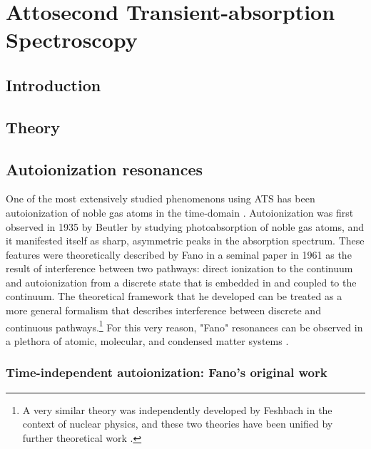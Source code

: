 \chapter{Attosecond Transient-absorption Spectroscopy}
\label{chap:ATS}

\section{Introduction}
\label{sec:intro_ats}

\section{Theory}
\label{sec:atas_theory}

\section{Autoionization resonances}
\label{sec:fano_ar}

One of the most extensively studied phenomenons using ATS has been autoionization of noble gas atoms in the time-domain \cite{wangAttosecondTimeResolvedAutoionization2010, ottAttosecondMultidimensionalInterferometry2012, stoossRealTimeReconstructionStrongFieldDriven2018, kaldunExtractingPhaseAmplitude2014, kaldunObservingUltrafastBuildup2016}.  Autoionization was first observed in 1935 by Beutler \cite{beutlerUeberAbsorptionsserienArgon1935} by studying photoabsorption of noble gas atoms, and it manifested itself as sharp, asymmetric peaks in the absorption spectrum.  These features were theoretically described by Fano in a seminal paper in 1961 \cite{fanoSulloSpettroDi1935, fanoEffectsConfigurationInteraction1961} as the result of interference between two pathways: direct ionization to the continuum and autoionization from a discrete state that is embedded in and coupled to the continuum. The theoretical framework that he developed can be treated as a more general formalism that describes interference between discrete and continuous pathways.\footnote{A very similar theory was independently developed by Feshbach in the context of nuclear physics, and these two theories have been unified by further theoretical work \cite{feshbachUnifiedTheoryNuclear1958, feshbachUnifiedTheoryNuclear1962, bhatiaLineshapeParameters1P1984}
	.} For this very reason, "Fano" resonances can be observed in a plethora of atomic, molecular, and condensed matter systems \cite{miroshnichenkoFanoResonancesNanoscale2010}.

\subsection{Time-independent autoionization: Fano's original work}
\label{sec:og_fano}

